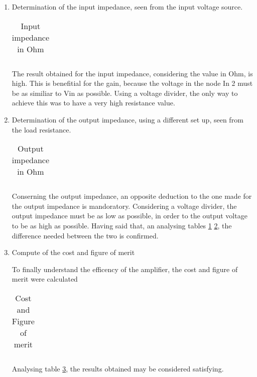 \begin{enumerate}
\begin{figure}[ht]
\begin{subfigure}{.5\textwidth}
\end{subfigure}
\end{figure}



\item Determination of the input impedance, seen from the input voltage source.

\begin{table}[h]
  \centering
  \begin{tabular}{|l|r|}
    \hline    
   
   \end{tabular}
  \caption{Input impedance in Ohm}
    \label{tab:ZI}
\end{table}

\par The result obtained for the input impedance, considering the value in Ohm, is high. This is benefitial for the gain, because the voltage in the node In 2 must be as similiar to Vin as possible. Using a voltage divider, the only way to achieve this was to have a very high resistance value.

\item Determination of the output impedance, using a different set up, seen from the load resistance. 

\begin{table}[h]
  \centering
  \begin{tabular}{|l|r|}
    \hline    
   
   \end{tabular}
  \caption{Output impedance in Ohm}
  
  \label{tab:ZO}
\end{table}


Conserning the output impedance, an opposite deduction to the one made for the output impedance is mandoratory. Considering a voltage divider, the output impedance must be as low as possible, in order to the output voltage to be as high as possible. Having said that, an analysing tables \ref{tab:ZI} \ref{tab:ZO}, the difference needed between the two is confirmed. 

\item Compute of the cost and figure of merit
\par To finally understand the efficency of the amplifier, the cost and figure of merit were calculated

\begin{table}[ht]
  \centering
  \begin{tabular}{|l|r|}
    \hline    
   
   \end{tabular}
  \caption{Cost and Figure of merit}
  \label{tab:cost}
\end{table}

Analysing table \ref{tab:cost}, the results obtained may be considered satisfying.


\end{enumerate}



